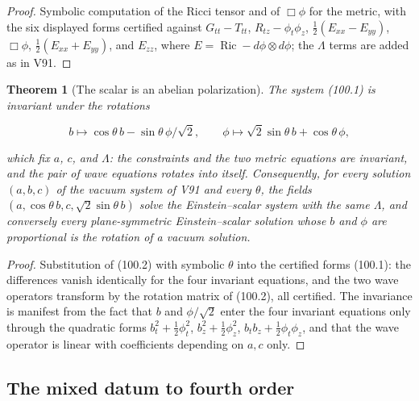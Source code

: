 \documentclass[11pt]{article}
\newtheorem{theorem}{Theorem}[section]
\theoremstyle{remark}
\begin{document}
\begin{proof}
Symbolic computation of the Ricci tensor and of \(\Box\phi\) for the
metric, with the six displayed forms certified against
\(G_{tt}-T_{tt}\), \(R_{tz}-\phi_t\phi_z\), \(\tfrac12(E_{xx}-E_{yy})\),
\(\Box\phi\), \(\tfrac12(E_{xx}+E_{yy})\), and \(E_{zz}\), where
\(E=\operatorname{Ric}-d\phi\otimes d\phi\); the \(\Lambda\) terms
are added as in V91.
\end{proof}

\begin{theorem}[The scalar is an abelian polarization]
\label{thm:v19v97-rotation}
The system (100.1) is invariant under the rotations

\[
 b\mapsto\cos\theta\,b-\sin\theta\,\phi/\sqrt2,\qquad
 \phi\mapsto\sqrt2\sin\theta\,b+\cos\theta\,\phi,                     \tag{100.2}
\]

which fix \(a\), \(c\), and \(\Lambda\): the constraints and the two
metric equations are invariant, and the pair of wave equations
rotates into itself.  Consequently, for every solution \((a,b,c)\) of
the vacuum system of V91 and every \(\theta\), the fields
\((a,\cos\theta\,b,c,\sqrt2\sin\theta\,b)\) solve the Einstein--scalar
system with the same \(\Lambda\), and conversely every plane-symmetric
Einstein--scalar solution whose \(b\) and \(\phi\) are proportional is
the rotation of a vacuum solution.
\end{theorem}

\begin{proof}
Substitution of (100.2) with symbolic \(\theta\) into the certified
forms (100.1): the differences vanish identically for the four
invariant equations, and the two wave operators transform by the
rotation matrix of (100.2), all certified.  The invariance is
manifest from the fact that \(b\) and \(\phi/\sqrt2\) enter the four
invariant equations only through the quadratic forms
\(b_t^2+\tfrac12\phi_t^2\), \(b_z^2+\tfrac12\phi_z^2\), \(b_tb_z+\tfrac12\phi_t\phi_z\),
and that the wave operator is linear with coefficients depending on
\(a,c\) only.
\end{proof}

\subsection{The mixed datum to fourth order}
\end{document}
